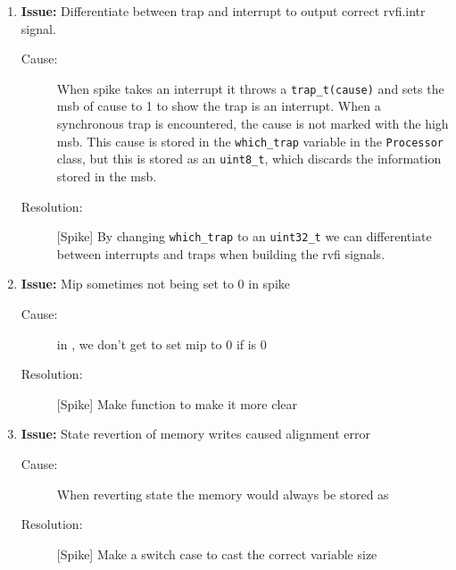 \begin{enumerate}
\item \textbf{Issue:} Differentiate between trap and interrupt to output correct rvfi.intr signal.
  \begin{description}
    \item[Cause:] When spike takes an interrupt it throws a \lstinline{trap_t(cause)} and sets the msb of cause to 1 to show the trap is an interrupt. When a synchronous trap is encountered, the cause is not marked with the high msb. This cause is stored in the \lstinline{which_trap} variable in the \lstinline{Processor} class, but this is stored as an \lstinline{uint8_t}, which discards the information stored in the msb.
    \item[Resolution:] [Spike] By changing \lstinline{which_trap} to an \lstinline{uint32_t} we can differentiate between interrupts and traps when building the rvfi signals.
  \end{description}

\item \textbf{Issue:} Mip sometimes not being set to 0 in spike
  \begin{description}
    \item[Cause:] in , we don't get to set mip to 0 if  is 0
    \item[Resolution:] [Spike] Make  function to make it more clear
  \end{description}

\item \textbf{Issue:} State revertion of memory writes caused alignment error
  \begin{description}
    \item[Cause:] When reverting state the memory would always be stored as 
    \item[Resolution:] [Spike] Make a switch case to cast the correct variable size 
  \end{description}

  
\end{enumerate}

